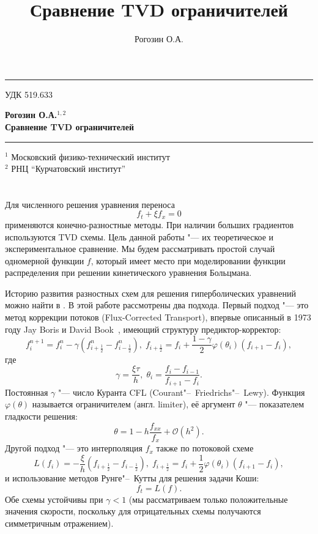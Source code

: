 \documentclass[a4paper,10pt]{article}
\title{Сравнение TVD ограничителей}
\author{Рогозин О.А.}
\date{}
\begin{document}
\begin{center}
	\rule{\linewidth}{0.5mm}
\end{center}
УДК 519.633
\begin{center}
	\large\bfseries Рогозин О.А.\({}^{1,2}\) \\[3mm]
	\huge\bfseries Сравнение TVD ограничителей \\
	\rule{\linewidth}{0.5mm}
\end{center}
	\({}^1\) Московский физико-технический институт \\
	\({}^2\) РНЦ ``Курчатовский институт'' \\

\section*{}
Для численного решения уравнения переноса \[f_t+\xi f_x=0 \] применяются конечно-разностные методы.
При наличии больших градиентов используются TVD схемы. Цель данной работы "--- их теоретическое и экспериментальное сравнение.
Мы будем рассматривать простой случай одномерной функции \(f\), который имеет место при моделировании функции распределения
при решении кинетического уравнения Больцмана.

Историю развития разностных схем для решения гиперболических уравнений можно найти в \cite{vanLeer2006}. В этой работе рассмотрены два подхода.
Первый подход "--- это метод коррекции потоков (Flux-Corrected Transport), впервые описанный в 1973 году Jay Boris и David Book~\cite{Boris1973},
имеющий структуру предиктор-корректор:
\begin{equation}\label{eq:pk}
	f_i^{n+1} = f_i^n - \gamma(f_{i+\frac1{2}}^n-f_{i-\frac1{2}}^n),\;
	f_{i+\frac1{2}} = f_i + \frac{1-\gamma}{2}\varphi(\theta_i)(f_{i+1} - f_i),
\end{equation}
где
\[ \gamma=\frac{\xi\tau}{h}, \; \theta_i = \frac{f_i - f_{i-1}}{f_{i+1} - f_i}.\]
Постоянная \(\gamma\) "--- число Куранта CFL (Courant"--~Friedrichs"--~Lewy). Функция \(\varphi(\theta)\) называется ограничителем (англ. limiter),
её аргумент \(\theta\) "--- показателем гладкости решения:
\[ \theta = 1-h\frac{f_{xx}}{f_x}+\mathcal{O}(h^2). \]
Другой подход "--- это интерполяция \(f_x\) также по потоковой схеме
\begin{equation}\label{eq:rk1}
	L(f_i) = - \frac{\xi}{h}(f_{i+\frac1{2}}-f_{i-\frac1{2}}),\;
	f_{i+\frac1{2}} = f_i + \frac1{2}\varphi(\theta_i)(f_{i+1} - f_i),
\end{equation}
и использование методов Рунге"--~Кутты для решения задачи Коши:
\begin{equation}\label{eq:rk2}
	f_t = L(f).
\end{equation}
Обе схемы устойчивы при \(\gamma < 1\) (мы рассматриваем только положительные значения скорости,
поскольку для отрицательных схемы получаются симметричным отражением).
\end{document}
